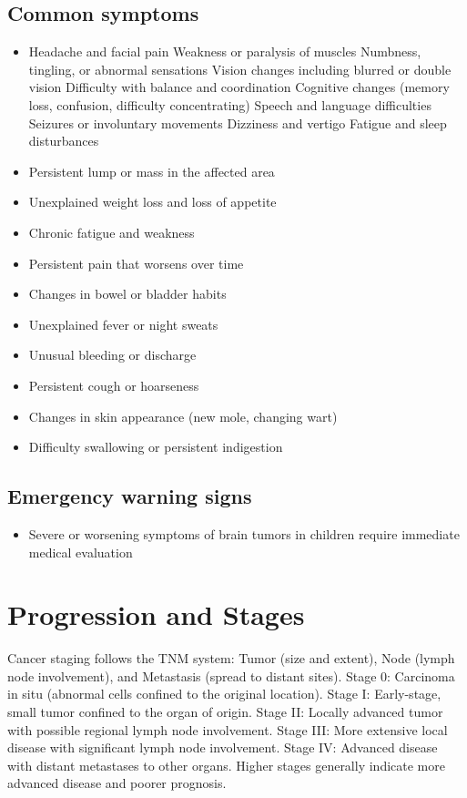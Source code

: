 \subsection{Common symptoms}
\begin{itemize}[noitemsep]
  \item Headache and facial pain Weakness or paralysis of muscles Numbness, tingling, or abnormal sensations Vision changes including blurred or double vision Difficulty with balance and coordination Cognitive changes (memory loss, confusion, difficulty concentrating) Speech and language difficulties Seizures or involuntary movements Dizziness and vertigo Fatigue and sleep disturbances
  \item Persistent lump or mass in the affected area
  \item Unexplained weight loss and loss of appetite
  \item Chronic fatigue and weakness
  \item Persistent pain that worsens over time
  \item Changes in bowel or bladder habits
  \item Unexplained fever or night sweats
  \item Unusual bleeding or discharge
  \item Persistent cough or hoarseness
  \item Changes in skin appearance (new mole, changing wart)
  \item Difficulty swallowing or persistent indigestion
\end{itemize}

\subsection{Emergency warning signs}
\begin{itemize}[noitemsep]
  \item Severe or worsening symptoms of brain tumors in children require immediate medical evaluation
\end{itemize}
\section{Progression and Stages}
Cancer staging follows the TNM system: Tumor (size and extent), Node (lymph node involvement), and Metastasis (spread to distant sites). Stage 0: Carcinoma in situ (abnormal cells confined to the original location). Stage I: Early-stage, small tumor confined to the organ of origin. Stage II: Locally advanced tumor with possible regional lymph node involvement. Stage III: More extensive local disease with significant lymph node involvement. Stage IV: Advanced disease with distant metastases to other organs. Higher stages generally indicate more advanced disease and poorer prognosis.

